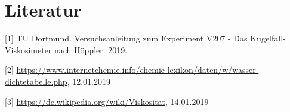 \section{Literatur}

[1] TU Dortmund. Versuchsanleitung zum Experiment V207 - Das Kugelfall-Viskosimeter nach Höppler. 2019. 

[2] \url{https://www.internetchemie.info/chemie-lexikon/daten/w/wasser-dichtetabelle.php}, 12.01.2019

[3] \url{https://de.wikipedia.org/wiki/Viskosität}, 14.01.2019